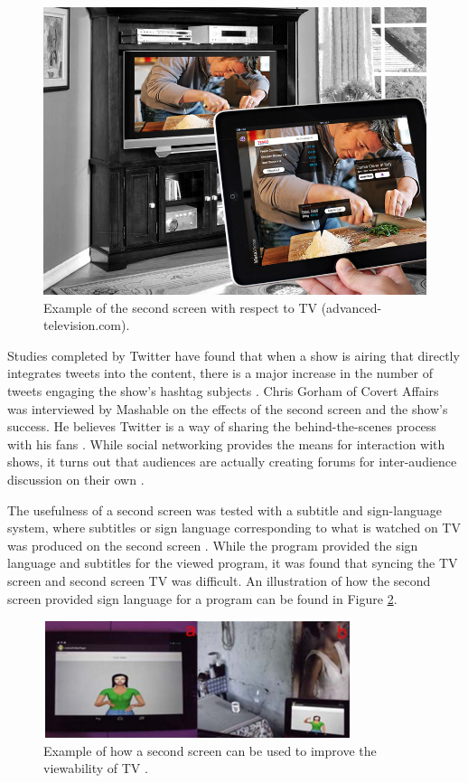 \documentclass[11pt, oneside]{article}
\begin{document}
\begin{figure}
    \centering
    \includegraphics[width=.8\textwidth]{second-screen.jpg}
    \caption{Example of the second screen with respect to TV (advanced-television.com).}
    \label{second-screen}
\end{figure}

Studies completed by Twitter have found that when a show is airing that directly integrates tweets into the content, there is a major increase in the number of tweets engaging the show's hashtag subjects \cite{TwitterTV}. Chris Gorham of Covert Affairs was interviewed by Mashable on the effects of the second screen and the show's success. He believes Twitter is a way of sharing the behind-the-scenes process with his fans \cite{MashableChris}. While social networking provides the means for interaction with shows, it turns out that audiences are actually creating forums for inter-audience discussion on their own \cite{ACM}.

The usefulness of a second screen was tested with a subtitle and sign-language system, where subtitles or sign language corresponding to what is watched on TV was produced on the second screen \cite{IEEE_EFS}. While the program provided the sign language and subtitles for the viewed program, it was found that syncing the TV screen and second screen TV was difficult. An illustration of how the second screen provided sign language for a program can be found in Figure \ref{sign-language}.

\begin{figure}
    \centering
    \includegraphics[width=.8\textwidth]{SignLanguage.png}
    \caption{Example of how a second screen can be used to improve the viewability of TV \cite{IEEE_EFS}.}
    \label{sign-language}
\end{figure}
\end{document}
